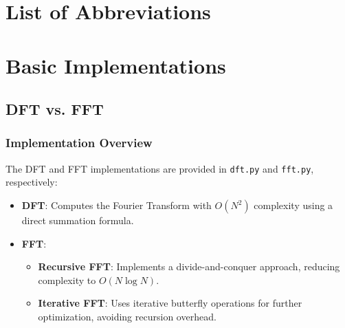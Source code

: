 \documentclass[12pt, a4paper]{report}
\begin{document}



\renewcommand{\contentsname}{Table of Contents}
\tableofcontents %
\newpage


\chapter*{List of Abbreviations}
\label{sec:abkuerzungsverzeichnis}
\begin{acronym}[OpenCV]
\end{acronym}
\newpage

\renewcommand{\listfigurename}{List of Figures}
\listoffigures
\newpage



\setcounter{page}{1}	%

\chapter{Basic Implementations}

\section{\ac{DFT} vs. \ac{FFT}}

\subsection{Implementation Overview}
The \ac{DFT} and \ac{FFT} implementations are provided in \texttt{dft.py} and \texttt{fft.py}, respectively:
\begin{itemize}
	\item \textbf{\ac{DFT}}: Computes the Fourier Transform with \(O(N^2)\) complexity using a direct summation formula.
	\item \textbf{\ac{FFT}}:
	      \begin{itemize}
		      \item \textbf{Recursive FFT}: Implements a divide-and-conquer approach, reducing complexity to \(O(N \log N)\).
		      \item \textbf{Iterative FFT}: Uses iterative butterfly operations for further optimization, avoiding recursion overhead.
	      \end{itemize}
\end{itemize}
\end{document}
